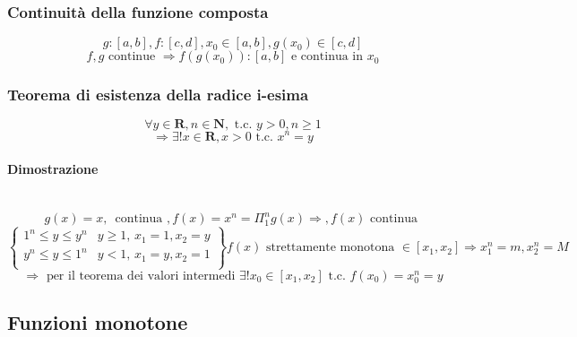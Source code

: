 \documentclass{report}
\newcommand{\subsubsubsection}[1]{\paragraph{#1}\mbox{}\\}
\begin{document}
        \subsubsection{Continuità della funzione composta}
            $$g: \left[a, b\right], f: \left[c, d\right], x_0 \in \left[a, b\right], g\left(x_0\right) \in \left[c, d\right]$$
            $$f, g \textrm{ continue } \Longrightarrow f\left(g\left(x_0\right)\right): 
                \left[a, b\right] \textrm{ e continua in }x_0$$
        \subsubsection{Teorema di esistenza della radice i-esima}
            $$\forall y \in \mathbf{R}, n \in \mathbf{N}, \textrm{ t.c. } y > 0, n \geq 1$$
            $$\Longrightarrow \exists! x \in \mathbf{R}, x > 0 \textrm { t.c. } x^n = y$$
            \subsubsubsection{Dimostrazione}
            $$g\left(x\right) = x, \, \textrm{ continua }, f\left(x\right) = x^n = \Pi_{1}^{n}g\left(x\right)
                \Longrightarrow, f\left(x\right) \textrm{ continua }$$
            $$ \left\{\begin{matrix} 
                    1^n \leq y \leq y^n & y \geq 1, \, x_1 = 1, x_2 = y \\
                    y^n \leq y \leq 1^n & y < 1, \, x_1 = y, x_2 = 1 \\
                \end{matrix} \right\}
                f\left(x\right) \textrm{ strettamente monotona } \in \left[x_1, x_2\right] \Longrightarrow x_1^n = m, x_2^n = M
            $$
            $$\Longrightarrow \textrm{ per il teorema dei valori intermedi } \exists !x_0 \in \left[x_1, x_2\right]
                \textrm{ t.c. } f\left(x_0\right) = x_0^n = y$$
    \subsection{Funzioni monotone}
\end{document}
